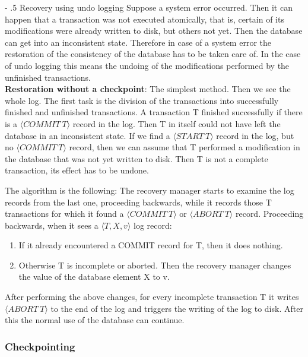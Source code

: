 \documentclass[margin=0px]{article}
\makeatletter
\renewcommand\paragraph{%
	\@startsection{paragraph}{4}{0mm}%
	{-\baselineskip}%
	{.5\baselineskip}%
	{\normalfont\normalsize\bfseries}}
\makeatother
\begin{document}
\paragraph{Recovery using undo logging}
Suppose a system error occurred. Then it can happen that a transaction was not executed atomically, that is,
certain of its modifications were already written to disk, but others not yet. Then the database can get into an inconsistent state.
Therefore in case of a system error the restoration of the consistency of the database has to be taken care of. In the case of undo logging
this means the undoing of the modifications performed by the unfinished transactions.\\

\noindent \textbf{Restoration without a checkpoint}: The simplest method. Then we see the whole log. The first task
is the division of the transactions into successfully finished and unfinished transactions. A transaction T finished successfully if
there is a $\langle COMMIT \ T \rangle$ record in the log. Then T in itself could not have left the database in an inconsistent state.
If we find a $\langle START \ T \rangle$ record in the log, but no $\langle COMMIT \ T \rangle$ record, then
we can assume that T performed a modification in the database that was not yet written to disk. Then T is not a complete
transaction, its effect has to be undone.

\noindent The algorithm is the following:
The recovery manager starts to examine the log records from the last one, proceeding backwards, while it records those
T transactions for which it found a $\langle COMMIT \ T \rangle$ or $\langle ABORT \ T \rangle$ record. Proceeding backwards,
when it sees a $\langle T,X,v\rangle$ log record:

\begin{enumerate}
    \item	If it already encountered a COMMIT record for T, then it does nothing.
    \item	Otherwise T is incomplete or aborted. Then the recovery manager changes the value of the database element X to v.
\end{enumerate}

After performing the above changes, for every incomplete transaction T it writes $\langle ABORT \ T \rangle$ to the end of the log and
triggers the writing of the log to disk. After this the normal use of the database can continue.

\subsubsection{Checkpointing}
\end{document}
